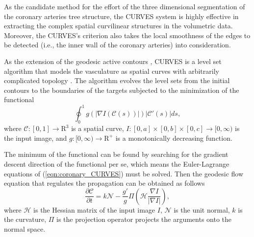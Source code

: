 As the candidate method for the effort of the three dimensional segmentation of the coronary arteries tree structure, the CURVES system \cite{Lorigo2001} is highly effective in extracting the complex spatial curvilinear structures in the volumetric data.
Moreover, the CURVES's criterion also takes the local smoothness of the edges to be detected (i.e., the inner wall of the coronary arteries) into consideration.

As the extension of the geodesic active contours \cite{Caselles1997}, CURVES is a level set algorithm that models the vasculature as spatial curves with arbitrarily complicated topology \cite{Lorigo2001}. %
The algorithm evolves the level sets from the initial contours to the boundaries of the targets subjected to the minimization of the functional
\begin{equation}
\label{eqn:coronary_CURVES}
\oint_0^1 g\left( \left| \nabla I \left( \mathcal{C} \left(  s \right) \right) \right| \right) \left| \mathcal{C}'\left( s \right) \right| ds,
\end{equation}
where $\mathcal{C}: [0,1] \rightarrow \mathrm{R}^3$ is a spatial curve, $I: [0, a] \times [0, b] \times [0, c] \rightarrow [0, \infty)$ is the input image, and $g: [0, \infty) \rightarrow \mathrm{R}^+$ is a monotonically decreasing function. %

The minimum of the functional can be found by searching for the gradient descent direction of the functional per se, which means the Euler-Lagrange equations of (\ref{eqn:coronary_CURVES}) must be solved. %
Then the geodesic flow equation that regulates the propagation can be obtained as follows
\begin{equation}
\label{eqn:coronary_evolution}
\frac{\partial \mathcal{C}}{\partial t} = k \mathcal{N} - \frac{g'}{g} \varPi \left( \mathcal{H} \frac{\nabla I}{ \left| \nabla I \right| } \right),
\end{equation}
where $\mathcal{H}$ is the Hessian matrix of the input image $I$, $\mathcal{N}$ is the unit normal, $k$ is the curvature, $\varPi$ is the projection operator projects the arguments onto the normal space. %

